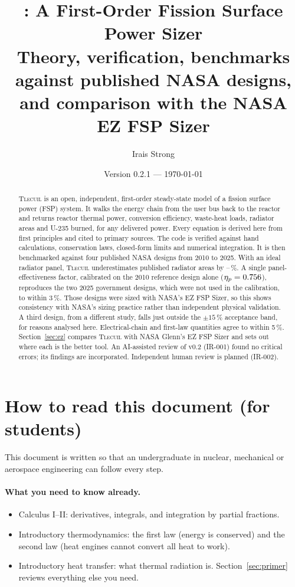 \documentclass[11pt]{article}
\title{\tlecuil{}: A First-Order Fission Surface Power Sizer\\[6pt]
\large Theory, verification, benchmarks against published NASA designs,\\
and comparison with the NASA EZ FSP Sizer}
\author{Irais Strong}
\date{Version 0.2.1 --- \today}
\numberwithin{equation}{section}
\numberwithin{table}{section}
\newcommand{\tlecuil}{\textsc{Tlecuil}}
\begin{document}
\maketitle

\begin{abstract}
\tlecuil{} is an open, independent, first-order steady-state model of a fission
surface power (FSP) system. It walks the energy chain from the user bus back to
the reactor and returns reactor thermal power, conversion efficiency, waste-heat
loads, radiator areas and U-235 burned, for any delivered power. Every equation is
derived here from first principles and cited to primary sources. The code is
verified against hand calculations, conservation laws, closed-form limits and
numerical integration. It is then benchmarked against four published NASA designs
from 2010 to 2025. With an ideal radiator panel, \tlecuil{} underestimates
published radiator areas by \idealmin--\idealmax\,\%. A single panel-effectiveness
factor, calibrated on the 2010 reference design alone ($\eta_p=0.756$), reproduces
the two 2025 government designs, which were not used in the calibration, to within
3\,\%. Those designs were sized with NASA's EZ FSP Sizer, so this shows consistency
with NASA's sizing practice rather than independent physical validation. A third
design, from a different study, falls just outside the $\pm15\,\%$ acceptance band,
for reasons analysed here. Electrical-chain and first-law quantities agree to within
5\,\%. Section~\ref{sec:ez}
compares \tlecuil{} with NASA Glenn's EZ FSP Sizer and sets out where each is
the better tool. An AI-assisted review of v0.2 (IR-001) found no critical errors; its
findings are incorporated. Independent human review is planned (IR-002).
\end{abstract}

\tableofcontents

\section*{How to read this document (for students)}
This document is written so that an undergraduate in nuclear, mechanical or
aerospace engineering can follow every step.

\paragraph{What you need to know already.}
\begin{itemize}
  \item Calculus I--II: derivatives, integrals, and integration by partial fractions.
  \item Introductory thermodynamics: the first law (energy is conserved) and the
        second law (heat engines cannot convert all heat to work).
  \item Introductory heat transfer: what thermal radiation is. Section~\ref{sec:primer}
        reviews everything else you need.
\end{itemize}
\end{document}
